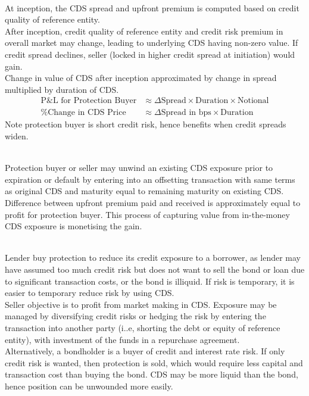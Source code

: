 \begin{remark} \\
At inception, the CDS spread and upfront premium is computed based on credit quality of reference entity.\\
After inception, credit quality of reference entity and credit risk premium in overall market may change, leading to underlying CDS having non-zero value. If credit spread declines, seller (locked in higher credit spread at initiation) would gain.\\
Change in value of CDS after inception approximated by change in spread multiplied by duration of CDS.
\begin{align}
\text{P\&L for Protection Buyer} &\approx \Delta\text{Spread} \times \text{Duration} \times \text{Notional} \nonumber \\
\text{\% Change in CDS Price} &\approx \Delta\text{Spread in bps} \times \text{Duration} \nonumber
\end{align}
Note protection buyer is short credit risk, hence benefits when credit spreads widen.
\end{remark}

\begin{remark} \\
Protection buyer or seller may unwind an existing CDS exposure prior to expiration or default by entering into an offsetting transaction with same terms as original CDS and maturity equal to remaining maturity on existing CDS. Difference between upfront premium paid and received is approximately equal to profit for protection buyer. This process of capturing value from in-the-money CDS exposure is monetising the gain.
\end{remark}

\begin{remark} \\
Lender buy protection to reduce its credit exposure to a borrower, as lender may have assumed too much credit risk but does not want to sell the bond or loan due to significant transaction costs, or the bond is illiquid. If risk is temporary, it is easier to temporary reduce risk by using CDS.\\
Seller objective is to profit from market making in CDS. Exposure may be managed by diversifying credit risks or hedging the risk by entering the transaction into another party (i..e, shorting the debt or equity of reference entity), with investment of the funds in a repurchase agreement.\\
Alternatively, a bondholder is a buyer of credit and interest rate risk. If only credit risk is wanted, then protection is sold, which would require less capital and transaction cost than buying the bond. CDS may be more liquid than the bond, hence position can be unwounded more easily. 
\end{remark}

